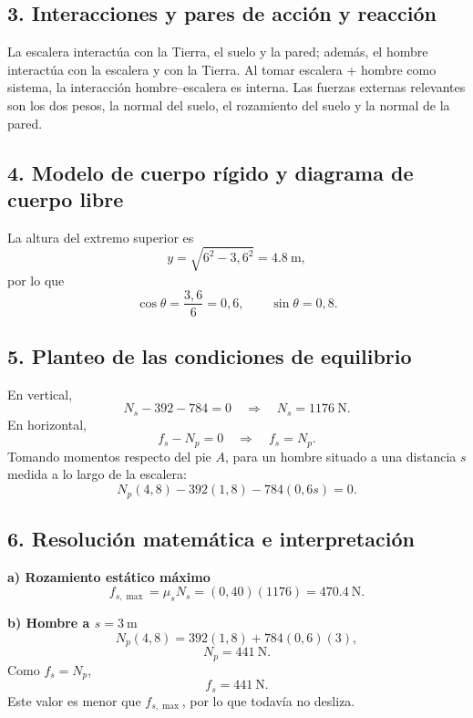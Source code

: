 \documentclass[12pt]{article}
\newcommand{\paso}[2]{%
  \subsection*{\color{AzulFisica}#1. #2}%
}
\begin{document}
\paso{3}{Interacciones y pares de acción y reacción}
La escalera interactúa con la Tierra, el suelo y la pared; además, el hombre interactúa con la escalera y con la Tierra. Al tomar escalera + hombre como sistema, la interacción hombre--escalera es interna. Las fuerzas externas relevantes son los dos pesos, la normal del suelo, el rozamiento del suelo y la normal de la pared.

\paso{4}{Modelo de cuerpo rígido y diagrama de cuerpo libre}
La altura del extremo superior es
\[
y=\sqrt{6^2-3,6^2}=\SI{4.8}{\meter},
\]
por lo que
\[
\cos\theta=\frac{3,6}{6}=0,6,\qquad \sin\theta=0,8.
\]

\begin{center}
\end{center}

\paso{5}{Planteo de las condiciones de equilibrio}
En vertical,
\[
N_s-392-784=0\quad\Rightarrow\quad N_s=\SI{1176}{\newton}.
\]
En horizontal,
\[
f_s-N_p=0\quad\Rightarrow\quad f_s=N_p.
\]
Tomando momentos respecto del pie $A$, para un hombre situado a una distancia $s$ medida a lo largo de la escalera:
\[
N_p(4,8)-392(1,8)-784(0,6s)=0.
\]

\paso{6}{Resolución matemática e interpretación}
\textbf{a) Rozamiento estático máximo}
\[
f_{s,\max}=\mu_sN_s=(0,40)(1176)=\boxed{\SI{470.4}{\newton}}.
\]

\textbf{b) Hombre a $s=\SI{3}{\meter}$}
\[
N_p(4,8)=392(1,8)+784(0,6)(3),
\]
\[
N_p=\SI{441}{\newton}.
\]
Como $f_s=N_p$,
\[
\boxed{f_s=\SI{441}{\newton}}.
\]
Este valor es menor que $f_{s,\max}$, por lo que todavía no desliza.
\end{document}
